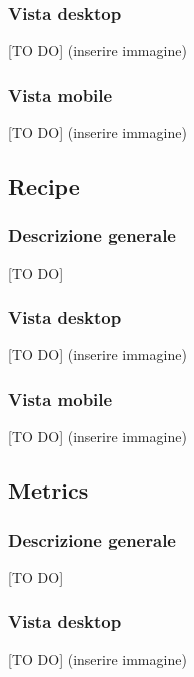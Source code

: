 		\subsubsection{Vista desktop} %
		[TO DO] (inserire immagine)

		\subsubsection{Vista mobile} %
		[TO DO] (inserire immagine)

	\subsection{Recipe} %
	\label{sub:recipe}
		\subsubsection{Descrizione generale} %
		[TO DO]

		\subsubsection{Vista desktop} %
		[TO DO] (inserire immagine)

		\subsubsection{Vista mobile} %
		[TO DO] (inserire immagine)

	\subsection{Metrics} %
	\label{sub:metrics}
		\subsubsection{Descrizione generale} %
		[TO DO]

		\subsubsection{Vista desktop} %
		[TO DO] (inserire immagine)

